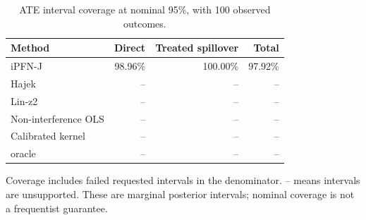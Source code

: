 \begin{table}[tb]
\centering
\caption{ATE interval coverage at nominal 95\%, with 100 observed outcomes.}
\begin{tabular}{lrrr}
\toprule
Method & Direct & Treated spillover & Total \\
\midrule
iPFN-J & 98.96\% & 100.00\% & 97.92\% \\
Hajek & -- & -- & -- \\
Lin-z2 & -- & -- & -- \\
Non-interference OLS & -- & -- & -- \\
Calibrated kernel & -- & -- & -- \\
oracle & -- & -- & -- \\
\bottomrule
\end{tabular}
\par\smallskip
\begin{minipage}{\linewidth}\scriptsize
Coverage includes failed requested intervals in the denominator. -- means intervals are unsupported.
These are marginal posterior intervals; nominal coverage is not a frequentist guarantee.
\end{minipage}
\end{table}
